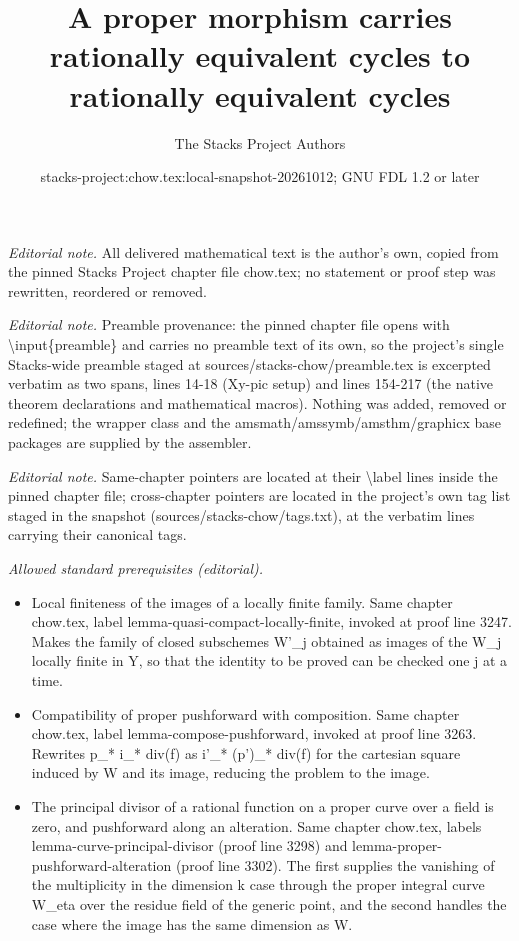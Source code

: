 \documentclass[10pt,a4paper]{amsart}
\title{A proper morphism carries rationally equivalent cycles to rationally equivalent cycles}
\author{The Stacks Project Authors}
\date{stacks-project:chow.tex:local-snapshot-20261012; GNU FDL 1.2 or later}
\theoremstyle{plain}
\theoremstyle{definition}
\theoremstyle{remark}
\numberwithin{equation}{subsection}
\begin{document}
\maketitle
\noindent\textit{Editorial note.} All delivered mathematical text is the author's own, copied from the pinned Stacks Project chapter file chow.tex; no statement or proof step was rewritten, reordered or removed.\par\medskip
\noindent\textit{Editorial note.} Preamble provenance: the pinned chapter file opens with \textbackslash{}input\{preamble\} and carries no preamble text of its own, so the project's single Stacks-wide preamble staged at sources/stacks-chow/preamble.tex is excerpted verbatim as two spans, lines 14-18 (Xy-pic setup) and lines 154-217 (the native theorem declarations and mathematical macros). Nothing was added, removed or redefined; the wrapper class and the amsmath/amssymb/amsthm/graphicx base packages are supplied by the assembler.\par\medskip
\noindent\textit{Editorial note.} Same-chapter pointers are located at their \textbackslash{}label lines inside the pinned chapter file; cross-chapter pointers are located in the project's own tag list staged in the snapshot (sources/stacks-chow/tags.txt), at the verbatim lines carrying their canonical tags.\par\medskip
\noindent\textit{Allowed standard prerequisites (editorial).}\begin{itemize}
\item Local finiteness of the images of a locally finite family. Same chapter chow.tex, label lemma-quasi-compact-locally-finite, invoked at proof line 3247. Makes the family of closed subschemes W'\_j obtained as images of the W\_j locally finite in Y, so that the identity to be proved can be checked one j at a time.
\item Compatibility of proper pushforward with composition. Same chapter chow.tex, label lemma-compose-pushforward, invoked at proof line 3263. Rewrites p\_* i\_* div(f) as i'\_* (p')\_* div(f) for the cartesian square induced by W and its image, reducing the problem to the image.
\item The principal divisor of a rational function on a proper curve over a field is zero, and pushforward along an alteration. Same chapter chow.tex, labels lemma-curve-principal-divisor (proof line 3298) and lemma-proper-pushforward-alteration (proof line 3302). The first supplies the vanishing of the multiplicity in the dimension k case through the proper integral curve W\_eta over the residue field of the generic point, and the second handles the case where the image has the same dimension as W.
\end{itemize}\medskip
\end{document}
